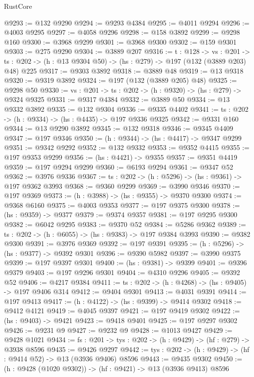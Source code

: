 \begin{lexlean}{RustCore}
\begin{coremodule}
@9293 := @132 @9290
@9294 := @9293 @4384
@9295 := @4011 @9294
@9296 := @4003 @9295
@9297 := @4058 @9296
@9298 := @158 @3892
@9299 := @9298 @160
@9300 := @3968 @9299
@9301 := @3968 @9300
@9302 := @159 @9301
@9303 := @275 @9290
@9304 := @3889 @207
@9316 := {t : @128} ->
  {vs : @201} ->
  {ts : @202} -> (h : @13 @9304 @50) -> (hs : @279) -> @197 (@132 (@3889 @203) @48) @225
@9317 := @9303 @3892
@9318 := @3889 @48
@9319 := @13 @9318
@9320 := @9319 @3892
@9324 := @197 (@132 (@3889 @205) @48)
@9325 := @9298 @50
@9330 := {vs : @201} -> {ts : @202} -> (h : @9320) -> (hs : @279) -> @9324 @9325
@9331 := @9317 @4384
@9332 := @3889 @50
@9334 := @13 @9332 @3892
@9335 := @132 @9304
@9336 := @9335 @4402
@9341 := {ts : @202} -> (h : @9334) -> (hs : @4435) -> @197 @9336 @9325
@9342 := @9331 @160
@9344 := @13 @9290 @3892
@9345 := @132 @9318
@9346 := @9345 @4409
@9347 := @197 @9346
@9350 := (h : @9344) -> (hs : @4417) -> @9347 @9299
@9351 := @9342 @9292
@9352 := @132 @9332
@9353 := @9352 @4415
@9355 := @197 @9353 @9299
@9356 := (hs : @4421) -> @9355
@9357 := @9351 @4419
@9359 := @197 @9294 @9299
@9360 := @6193 @9294
@9361 := @9347 @52
@9362 := @3976 @9336
@9367 := {ts : @202} -> (h : @5296) -> (hs : @9361) -> @197 @9362 @3993
@9368 := @9360 @9299
@9369 := @3990 @9346
@9370 := @197 @9369
@9373 := (h : @3988) -> (hs : @9355) -> @9370 @9300
@9374 := @9368 @6160
@9375 := @4003 @9353
@9377 := @197 @9375 @9300
@9378 := (hs : @9359) -> @9377
@9379 := @9374 @9357
@9381 := @197 @9295 @9300
@9382 := @6042 @9295
@9383 := @9370 @52
@9384 := @5286 @9362
@9389 := {ts : @202} -> (h : @6055) -> (hs : @9383) -> @197 @9384 @3993
@9390 := @9382 @9300
@9391 := @3976 @9369
@9392 := @197 @9391
@9395 := (h : @5296) -> (hs : @9377) -> @9392 @9301
@9396 := @9390 @5982
@9397 := @3990 @9375
@9399 := @197 @9397 @9301
@9400 := (hs : @9381) -> @9399
@9401 := @9396 @9379
@9403 := @197 @9296 @9301
@9404 := @4310 @9296
@9405 := @9392 @52
@9406 := @4217 @9384
@9411 := {ts : @202} -> (h : @4268) -> (hs : @9405) -> @197 @9406 @314
@9412 := @9404 @9301
@9413 := @4031 @9391
@9414 := @197 @9413
@9417 := (h : @4122) -> (hs : @9399) -> @9414 @9302
@9418 := @9412 @4121
@9419 := @4045 @9397
@9421 := @197 @9419 @9302
@9422 := (hs : @9403) -> @9421
@9423 := @9418 @9401
@9425 := @197 @9297 @9302
@9426 := @9231 @9
@9427 := @9232 @9
@9428 := @1013 @9427
@9429 := @9428 @1021
@9434 := {fs : @201} -> {tys : @202} -> (h : @9429) -> (hf : @279) -> @3938 @8596
@9435 := @9426 @9297
@9442 := {tys : @202} -> (h : @9429) -> (hf : @9414 @52) -> @13 (@3936 @9406) @8596
@9443 := @9435 @9302
@9450 := (h : @9428 (@1020 @9302)) -> (hf : @9421) -> @13 (@3936 @9413) @8596

\end{coremodule}
\end{lexlean}

